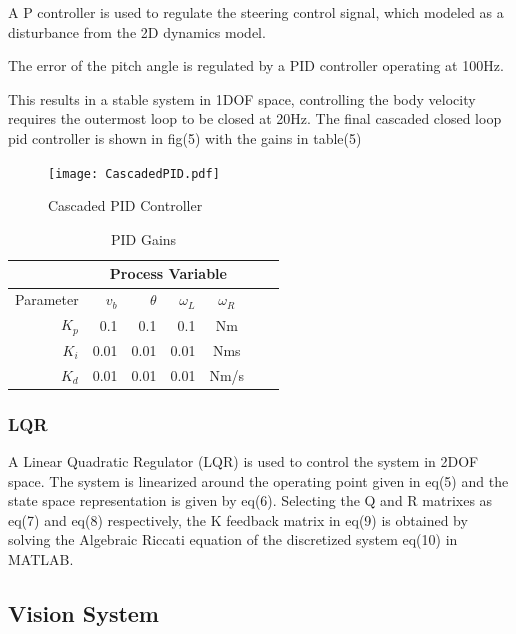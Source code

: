         A P controller is used to regulate the steering control signal, which modeled
        as a disturbance from the 2D dynamics model.

        The error of the pitch angle is regulated by a PID controller operating at 100Hz. 
        
        This results in a stable system in 1DOF space, controlling the body velocity requires the outermost loop to be closed at 20Hz.
        The final cascaded closed loop pid controller is shown in fig(5) with the gains in table(5)

        \begin{figure}[H]
            \texttt{[image: CascadedPID.pdf]}
            \caption{Cascaded PID Controller}
        \end{figure}

        \begin{table}[H]
            \centering
            \begin{tabular}{|r|r|r|r|c|c|c}
                \hline
                & \multicolumn{4}{c|}{Process Variable}  \\
                \hline
                Parameter & $v_b$ & $\theta$  & $\omega_L$ & $\omega_R$ \\
                \hline      
                $K_p$ & 0.1 & 0.1 & 0.1 & Nm \\
                $K_i$ & 0.01 & 0.01 & 0.01 & Nms \\
                $K_d$ & 0.01 & 0.01 & 0.01 & Nm/s \\
                \hline
            \end{tabular}
            \caption{PID Gains}
        \end{table}
        \pagebreak{}
        \subsubsection{LQR}
        A Linear Quadratic Regulator (LQR) is used to control the system in 2DOF space.
        The system is linearized around the operating point given in eq(5) 
        and the state space representation is given by eq(6).
        Selecting the Q and R matrixes as eq(7) and eq(8) respectively, 
        the K feedback matrix in eq(9) is obtained by solving the Algebraic Riccati
        equation of the discretized system eq(10) in MATLAB.

         

    \subsection{Vision System}
